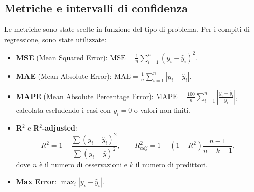 \documentclass[a4paper,12pt]{report}
\begin{document}
	\subsection{Metriche e intervalli di confidenza}
	Le metriche sono state scelte in funzione del tipo di problema. Per i compiti di regressione, sono state utilizzate:
	\begin{itemize}
		\item \textbf{MSE} (Mean Squared Error): \(\text{MSE} = \frac{1}{n} \sum_{i=1}^{n} (y_i - \hat{y}_i)^2\).
		\item \textbf{MAE} (Mean Absolute Error): \(\text{MAE} = \frac{1}{n} \sum_{i=1}^{n} |y_i - \hat{y}_i|\).
		\item \textbf{MAPE} (Mean Absolute Percentage Error): \(\text{MAPE} = \frac{100}{n} \sum_{i=1}^{n} \left| \frac{y_i - \hat{y}_i}{y_i} \right|\), calcolata escludendo i casi con \(y_i=0\) o valori non finiti.
		\item \textbf{R\(^2\)} e \textbf{R\(^2\)-adjusted}:
		\[
		R^2 = 1 - \frac{\sum (y_i - \hat{y}_i)^2}{\sum (y_i - \bar{y})^2}, \qquad
		R^2_{adj} = 1 - (1 - R^2)\frac{n-1}{n-k-1},
		\]
		dove \(n\) è il numero di osservazioni e \(k\) il numero di predittori.
		\item \textbf{Max Error}: \(\max_i |y_i - \hat{y}_i|\).
	\end{itemize}
	
\end{document}
